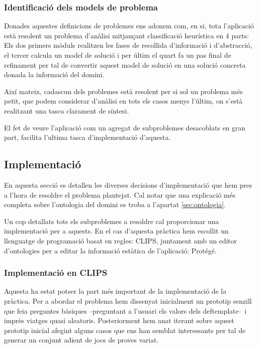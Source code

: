 \documentclass[11pt,a4paper]{article}
\begin{document}
\subsubsection{Identificació dels models de problema}

Donades aquestes definicions de problemes ens adonem com, en si, tota l'aplicació està resolent un problema d'anàlisi mitjançant classificació heurística en 4 parts: Els dos primers mòduls realitzen les fases de recollida d'informació i d'abstracció, el tercer calcula un model de solució i per últim el quart fa un pas final de refinament per tal de convertir aquest model de solució en una solució concreta donada la informació del domini.

Així mateix, cadascun dels problemes està resolent per si sol un problema més petit, que podem considerar d'anàlisi en tots els casos menys l'últim, on s'està realitzant una tasca clarament de síntesi.

El fet de veure l'aplicació com un agregat de subproblemes desacoblats en gran part, facilita l'ultima tasca d'implementació d'aquesta.
\subsection{Implementació}
\label{sec:implementacio}
En aquesta secció es detallen les diverses decisions d'implementació que hem pres a l'hora de resoldre el problema plantejat. Cal notar que una explicació més completa sobre l'ontologia del domini es troba a l'apartat \ref{sec:ontologia}.

Un cop detallats tots els subproblemes a resoldre cal proporcionar una implementació per a aquests. En el cas d'aquesta pràctica hem escollit un llenguatge de programació basat en regles: CLIPS, juntament amb un editor d'ontologies per a editar la informació estàtica de l'aplicació: Protégé.

\subsubsection{Implementació en CLIPS}
Aquesta ha estat potser la part més important de la implementació de la pràctica. Per a abordar el problema hem dissenyat inicialment un prototip senzill que feia preguntes bàsiques --preguntant a l'usuari els valors dels deftemplate-- i imprès viatges quasi aleatoris. Posteriorment hem anat iterant sobre aquest prototip inicial afegint alguns casos que ens han semblat interessants per tal de generar un conjunt adient de jocs de proves variat.
\end{document}
